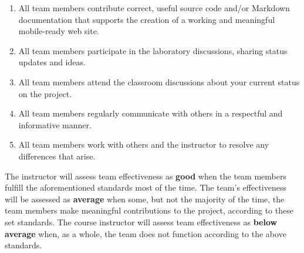 \documentclass[11pt]{article}
\begin{document}
\begin{enumerate}
  \setlength{\itemsep}{0pt}

\item All team members contribute correct, useful source code and/or
  Markdown documentation that supports the creation of a working and meaningful
  mobile-ready web site.

\item All team members participate in the laboratory discussions, sharing status
  updates and ideas.

\item All team members attend the classroom discussions about your current
  status on the project.

\item All team members regularly communicate with others in a respectful and
  informative manner.

\item All team members work with others and the instructor to resolve any
  differences that arise.

\end{enumerate}

\vspace*{-.5em}

The instructor will assess team effectiveness as {\bf good} when the team
members fulfill the aforementioned standards most of the time. The team's
effectiveness will be assessed as {\bf average} when some, but not the majority
of the time, the team members make meaningful contributions to the project,
according to these set standards. The course instructor will assess team
effectiveness as {\bf below average} when, as a whole, the team does not
function according to the above standards.
\end{document}
